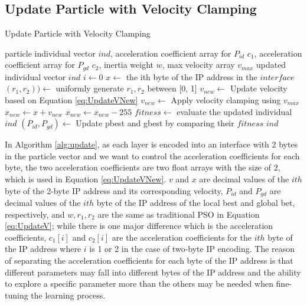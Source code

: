 \documentclass[conference]{IEEEtran}
\begin{document}
\subsection{Update Particle with Velocity Clamping}
\begin{algorithm}
	\caption{Update Particle with Velocity Clamping}
	\label{alg:update}
	\begin{algorithmic}
		\renewcommand{\algorithmicrequire}{\textbf{Input:}}
		\renewcommand{\algorithmicensure}{\textbf{Output:}}
		\REQUIRE particle individual vector $ind$, acceleration coefficient array for $P_{id}$ $c_{1}$, acceleration coefficient array for $P_{gd}$ $c_{2}$, inertia weight $w$, max velocity array $v_{max}$
		\ENSURE updated individual vector $ind$
			\STATE $i \leftarrow 0$
				\STATE $x \leftarrow$ the ith byte of the IP address in the $interface$
				\STATE $(r_{1}, r_{2})) \leftarrow$ uniformly generate $r_{1}, r_{2}$ between [0, 1]
				\STATE $v_{new} \leftarrow$ Update velocity based on Equation \ref{eq:UpdateVNew}
				\STATE $v_{new} \leftarrow$ Apply velocity clamping using $v_{max}$
				\STATE $x_{new} \leftarrow x + v_{new}$
					\STATE $x_{new} \leftarrow x_{new}-255$
				\ENDIF
			\ENDFOR
		\ENDFOR
		\STATE $fitness \leftarrow$ evaluate the updated individual $ind$
		\STATE $(P_{id}, P_{gd}) \leftarrow$ Update pbest and gbest by comparing their $fitness$
		\RETURN $ind$
	\end{algorithmic}
\end{algorithm}

In Algorithm \ref{alg:update}, as each layer is encoded into an interface with 2 bytes in the particle vector and we want to control the acceleration coefficients for each byte, the two acceleration coefficients are two float arrays with the size of 2, which is used in Equation \ref{eq:UpdateVNew}. $v$ and $x$ are decimal values of the $ith$ byte of the 2-byte IP address and its corresponding velocity, $P_{id}$ and $P_{gd}$ are decimal values of the $ith$ byte of the IP address of the local best and global bet, respectively, and $w, r_{1}, r_{2}$ are the same as traditional PSO in Equation \ref{eq:UpdateV}; while there is one major difference which is the acceleration coefficients, $c_{1}[i]$ and $c_{2}[i]$ are the acceleration coefficients for the $ith$ byte of the IP address where $i$ is 1 or 2 in the case of two-byte IP encoding. The reason of separating the acceleration coefficients for each byte of the IP address is that different parameters may fall into different bytes of the IP address and the ability to explore a specific parameter more than the others may be needed when fine-tuning the learning process. 
\end{document}
